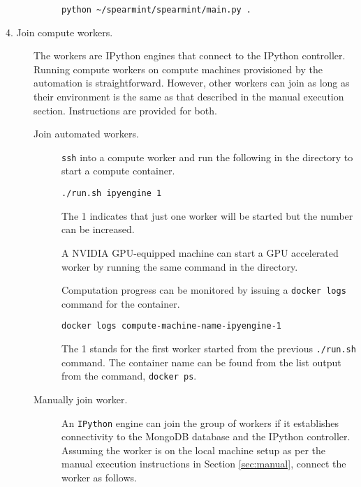 \begin{description}
\begin{description}
\begin{verbatim}
python ~/spearmint/spearmint/main.py .
\end{verbatim}


\end{description}


\item[4. Join compute workers.] \hfill

The workers are \textsf{IPython} engines that connect to the \textsf{IPython} controller.
%
Running compute workers on compute machines provisioned by the automation is straightforward. 
%
However, other workers can join as long as their environment is the same as that described in the manual execution section.
%
Instructions are provided for both.

\begin{description}


\item[Join automated workers.] \hfill

  \texttt{ssh} into a compute worker and run the following in the  directory to start a compute container.

\begin{verbatim}
./run.sh ipyengine 1
\end{verbatim}

%
The 1 indicates that just one worker will be started but the number can be increased.


A NVIDIA GPU-equipped machine can start a GPU accelerated worker by running the same command in the  directory.


Computation progress can be monitored by issuing a \texttt{docker logs} command for the container.

\begin{verbatim}
docker logs compute-machine-name-ipyengine-1
\end{verbatim}

The 1 stands for the first worker started from the previous \texttt{./run.sh} command.
%
The container name can be found from the list output from the command, \texttt{docker ps}.

\item[Manually join worker.] \hfill

An \texttt{IPython} engine can join the group of workers if it establishes connectivity to the \textsf{MongoDB} database and the \textsf{IPython} controller.
%
Assuming the worker is on the local machine setup as per the manual execution instructions in Section \ref{sec:manual}, connect the worker as follows.


\end{description}
\end{description}

